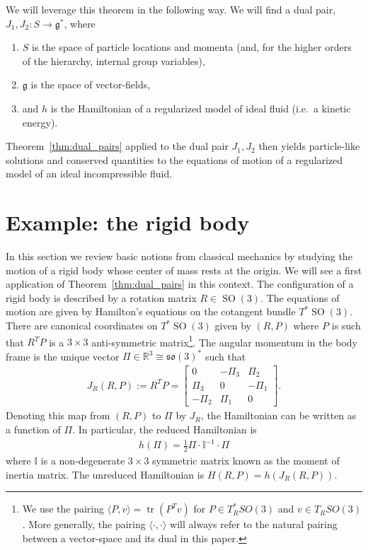 \documentclass[12pt]{amsart}
\newcommand{\so}{\ensuremath{\mathfrak{so}}}
\DeclareMathOperator{\SO}{SO}
\DeclareMathOperator{\tr}{tr}
\begin{document}
We will leverage this theorem in the following way.
We will find a dual pair, $J_1,J_2: S \to \mathfrak{g}^*$, where
\begin{enumerate}
\item $S$ is the space of particle locations and momenta (and, for the higher orders of the hierarchy, internal group variables),
\item $\mathfrak{g}$ is the space of vector-fields,
\item and $h$ is the Hamiltonian of a regularized model of ideal fluid (i.e.\ a kinetic energy).
\end{enumerate}
Theorem~\ref{thm:dual_pairs} applied to the dual pair $J_1,J_2$
then yields particle-like solutions and conserved quantities to the equations of motion
of a regularized model of an ideal incompressible fluid.

\section{Example: the rigid body}
\label{sec:rigid_body}
  In this section we review basic notions from classical mechanics
by studying the motion of a rigid body whose center of mass rests
at the origin.
We will see a first application of Theorem~\ref{thm:dual_pairs}
in this context.
The configuration of a rigid body is described by a
rotation matrix $R \in \SO(3)$.
The equations of motion are given by Hamilton's equations
on the cotangent bundle $T^*\SO(3)$.
There are canonical coordinates on $T^*\SO(3)$ given by $(R,P)$
where $P$ is such that $R^TP $ is a $3 \times 3$ anti-symmetric
matrix\footnote{%
  We use the pairing $\langle P, v \rangle = \tr(P^T v)$ for
  $P \in T^*_R SO(3)$ and $v \in T_R SO(3)$. More generally, the pairing $\langle \cdot , \cdot \rangle$ will always refer to the natural pairing between a vector-space and its dual in this paper.}.
The angular momentum in the body frame is the
unique vector $\Pi \in \mathbb{R}^3 \cong \so(3)^*$ such that
\begin{align*}
  J_R(R,P) := R^TP = \begin{bmatrix}
    0 & -\Pi_3 & \Pi_2 \\
    \Pi_3 & 0 & -\Pi_1 \\
    -\Pi_2 & \Pi_1 & 0 
    \end{bmatrix}.
\end{align*}
Denoting this map from $(R,P)$ to $\Pi$ by $J_R$,
the Hamiltonian can be written as a function
of $\Pi$.  In particular, the reduced Hamiltonian is
\begin{align*}
  h(\Pi) = \frac{1}{2}\Pi \cdot \mathbb{I}^{-1} \cdot \Pi
\end{align*}
where $\mathbb{I}$ is a non-degenerate $3\times 3$ symmetric matrix
known as the moment of inertia matrix.
The unreduced Hamiltonian is $H(R,P) = h(J_R(R,P))$.
\end{document}
